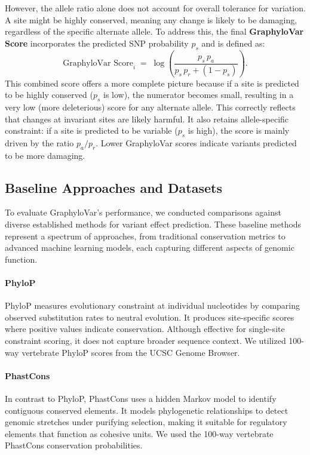 \documentclass[unnumsec,webpdf,contemporary,large]{oup-authoring-template}%
\theoremstyle{thmstyleone}%
\theoremstyle{thmstyletwo}%
\theoremstyle{thmstylethree}%
\begin{document}
However, the allele ratio alone does not account for overall tolerance for variation. A site might be highly conserved, meaning any change is likely to be damaging, regardless of the specific alternate allele. To address this, the final \textbf{GraphyloVar Score} incorporates the predicted SNP probability \(p_s\) and is defined as:
\begin{equation}
\text{GraphyloVar Score}_i \;=\; \log\!\left(\frac{p_s\, p_a}{p_s\, p_r + (1 - p_s)}\right).
\end{equation}
This combined score offers a more complete picture because if a site is predicted to be highly conserved (\(p_s\) is low), the numerator becomes small, resulting in a very low (more deleterious) score for any alternate allele. This correctly reflects that changes at invariant sites are likely harmful. It also retains allele-specific constraint: if a site is predicted to be variable (\(p_s\) is high), the score is mainly driven by the ratio \(p_a / p_r\). Lower GraphyloVar scores indicate variants predicted to be more damaging.

\subsection{Baseline Approaches and Datasets}

To evaluate GraphyloVar's performance, we conducted comparisons against diverse established methods for variant effect prediction. These baseline methods represent a spectrum of approaches, from traditional conservation metrics to advanced machine learning models, each capturing different aspects of genomic function.

\paragraph{PhyloP \citep{pollard2010detection}} PhyloP measures evolutionary constraint at individual nucleotides by comparing observed substitution rates to neutral evolution. It produces site-specific scores where positive values indicate conservation. Although effective for single-site constraint scoring, it does not capture broader sequence context. We utilized 100-way vertebrate PhyloP scores from the UCSC Genome Browser.

\paragraph{PhastCons \citep{siepel2005evolutionarily}} In contrast to PhyloP, PhastCons uses a hidden Markov model to identify contiguous conserved elements. It models phylogenetic relationships to detect genomic stretches under purifying selection, making it suitable for regulatory elements that function as cohesive units. We used the 100-way vertebrate PhastCons conservation probabilities.
\end{document}
